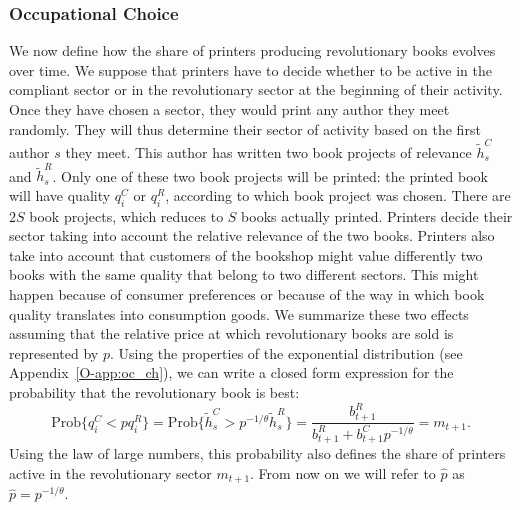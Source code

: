  \subsubsection*{Occupational Choice}

We now define how the share of printers producing revolutionary books evolves over time. We suppose that printers have to decide whether to be active in the compliant sector or in the revolutionary sector at the beginning of their activity. Once they have chosen a sector, they would print any author they meet randomly.
They will thus determine their sector of activity based on the first author $s$ they meet. This author has written two book projects of relevance $\tilde{h}^C_s$ and $\tilde{h}^R_s $. Only one of these two book projects will be printed: the printed book will have quality $q^C_i$ or $q^R_i$, according to which book project was chosen. There are $2S$ book projects, which reduces to $S$ books actually printed. Printers decide their sector taking into account the relative relevance of the two books. Printers also take into account that customers of the bookshop might value differently two books with the same quality that belong to two different sectors. This might happen because of consumer preferences or because of the way in which book quality translates into consumption goods.
We summarize these two effects assuming that the relative price at which revolutionary books are sold is represented by $p$.  Using the properties of the exponential distribution (see Appendix~\ref{O-app:oc_ch}), we can write a closed form expression for the probability that the revolutionary book is best:
\begin{equation}
\text{Prob}\{q^C_i<p q^R_i\}=\text{Prob}\{\tilde{h}^C_s>p^{-1/\theta}\tilde{h}^R_s\}=\frac{b^R_{t+1}}{b^R_{t+1}+b^C_{t+1} p^{-1/\theta}}=m_{t+1}.\label{eq:occupation}
\end{equation}
Using the law of large numbers, this probability also defines the share of printers active in the revolutionary sector $m_{t+1}$. From now on we will refer to $\hat{p}$ as $\hat{p}=p^{-1/\theta}$.

